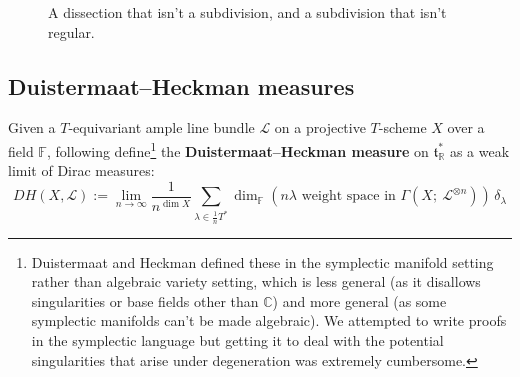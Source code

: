 \documentclass[10pt,a4paper]{amsart}
\newcommand{\RR}{\mathbb{R}}
\newcommand{\CC}{\mathbb{C}}
\newcommand\defn[1]{{\bf #1}}
\newcommand\lie[1]{{\mathfrak #1}}
\newcommand\FF{{\mathbb F}}
\newcommand\tensor\otimes
\newcommand\calL{{\mathcal L}}
\begin{document}
\begin{figure}[h]
  \centering
{}
  \qquad
{}
  \caption{A dissection that isn't a subdivision, and a subdivision that isn't regular.}
  \label{fig:dissections}
\end{figure}


\subsection{Duistermaat--Heckman measures}

Given a $T$-equivariant ample line bundle $\calL$ on a projective $T$-scheme $X$
over a field $\FF$, following \cite{brion1990action,guillemin1996symplectic}
define\footnote{%
  Duistermaat and Heckman defined these in the symplectic manifold setting rather than
  algebraic variety setting, which is less general (as it disallows singularities
  or base fields other than $\CC$) and more general (as some symplectic manifolds
  can't be made algebraic). We attempted to write proofs in the symplectic
  language but getting it to deal with the potential singularities that arise
  under degeneration was extremely cumbersome.}
the \defn{Duistermaat--Heckman measure} on $\lie t_\RR^*$
as a weak limit of Dirac measures:
\begin{equation}\label{eq:DH-def}
	DH(X,\calL) := \lim_{n\to\infty} \frac{1}{n^{\dim X}}
	\sum_{\lambda \in \frac{1}{n}T^*}
	\dim_\FF(n\lambda\text{ weight space in }\Gamma(X;\ \calL^{\tensor n}))
	\, \delta_\lambda
\end{equation}
\end{document}
